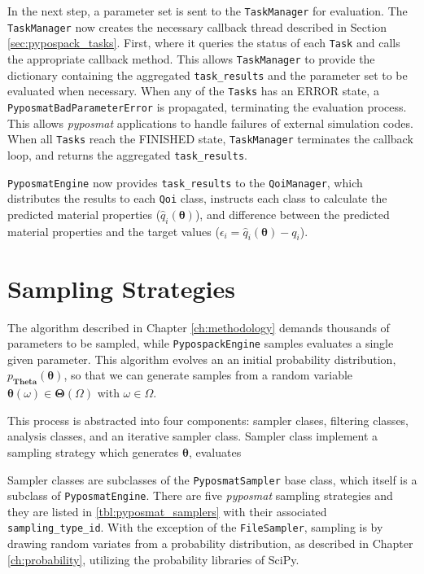 In the next step, a parameter set is sent to the \verb|TaskManager| for evaluation.  The \verb|TaskManager| now creates the necessary  callback thread described in Section \ref{sec:pypospack_tasks}.  First, where it queries the status of each \verb|Task| and calls the appropriate callback method.  This allows \verb|TaskManager| to provide the dictionary containing the aggregated \verb|task_results| and the parameter set to be evaluated when necessary.  When any of the \verb|Tasks| has an ERROR state, a \verb|PyposmatBadParameterError| is propagated, terminating the evaluation process.  This allows \emph{pyposmat} applications to handle failures of external simulation codes.  When all \verb|Tasks| reach the FINISHED state, \verb|TaskManager| terminates the callback loop, and returns the aggregated \verb|task_results|.

\verb|PyposmatEngine| now provides \verb|task_results| to the \verb|QoiManager|, which distributes the results to each \verb|Qoi| class, instructs each class to calculate the predicted material properties ($\hat{q}_i(\bm{\theta})$), and difference between the predicted material properties and the target values ($\epsilon_i = \hat{q}_i(\bm{\theta})-q_i$).

\section{Sampling Strategies}
\label{sec:software_sampling_strategies}

The algorithm described in Chapter \ref{ch:methodology} demands thousands of parameters to be sampled, while \verb|PypospackEngine| samples evaluates a single given parameter.  This algorithm evolves an an initial probability distribution, $p_{\bm{Theta}}(\bm{\theta})$, so that we can generate samples from a random variable $\bm{\theta}(\omega) \in \bm{\Theta}(\Omega)$ with $\omega \in \Omega$.

This process is abstracted into four components: sampler clases, filtering classes, analysis classes, and an iterative sampler class.  Sampler class implement a sampling strategy which generates $\bm{\theta}$, evaluates

Sampler classes are subclasses of the \verb|PyposmatSampler| base class, which itself is a subclass of \verb|PyposmatEngine|.  There are five \emph{pyposmat} sampling strategies and they are listed in \ref{tbl:pyposmat_samplers} with their associated \verb|sampling_type_id|.  With the exception of the \verb|FileSampler|, sampling is by drawing random variates from a probability distribution, as described in Chapter \ref{ch:probability}, utilizing the probability libraries of SciPy.

